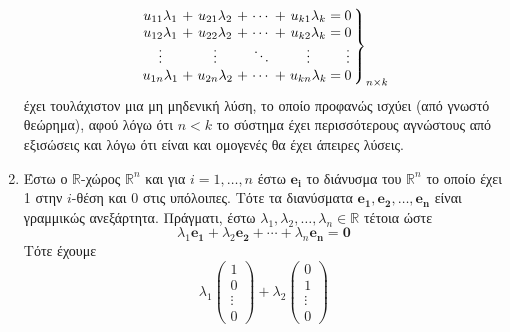 \begin{examples}
\begin{enumerate}
\begin{equation*}
                \setlength\arraycolsep{1.5pt} %
                \left.
                    \begin{array}{ccc ccc c @{\extracolsep{2.5pt}}c
                        @{\extracolsep{2.5pt}}c}
                        u_{11} \lambda _{1} & + & u_{21} \lambda _{2} & + & 
                        \cdots & + & u_{k1}\lambda_{k} & = & 0 \\
                        u_{12}\lambda_{1} & + & u_{22}\lambda_{2} & + & \cdots & 
                        + & u_{k2}\lambda_{k} & = & 0 \\
                        \vdots & & \vdots & & \ddots & &  \vdots & &  \vdots \\
                        u_{1n}\lambda_{1} & + & u_{2n}\lambda_{2} & + & \cdots & 
                        + & u_{kn}\lambda_{k} & = & 0 \\
                    \end{array}
                \right\} _{n \times k}
            \end{equation*}    
            έχει τουλάχιστον μια μη μηδενική λύση, το οποίο προφανώς ισχύει 
            (από γνωστό θεώρημα), αφού λόγω ότι $ n<k $ το σύστημα έχει 
            περισσότερους αγνώστους από εξισώσεις και λόγω ότι είναι και 
            ομογενές θα έχει άπειρες λύσεις.
        \item Έστω ο $ \mathbb{R} $-χώρος $ \mathbb{R}^{n} $ και για $ i= 1,\ldots,n $
            έστω $ \mathbf{e_{i}} $ το διάνυσμα του $ \mathbb{R}^{n} $ το οποίο έχει 
            1 στην $ i $-θέση και 0 στις υπόλοιπες. Τότε τα διανύσματα 
            $ \mathbf{e_{1}}, \mathbf{e_{2}}, \ldots, \mathbf{e_{n}} $ είναι 
            γραμμικώς ανεξάρτητα. Πράγματι, έστω 
            $ \lambda _{1}, \lambda _{2}, \ldots, \lambda _{n} \in \mathbb{R} $ 
            τέτοια ώστε 
            \[
                \lambda _{1} \mathbf{e_{1}}+ \lambda _{2} \mathbf{e_{2}} 
                + \cdots + \lambda _{n} \mathbf{e_{n}}= \mathbf{0}  
            \]
            Τότε έχουμε
            \[
                \lambda _{1} 
                \begin{pmatrix*} 1 \\ 0 \\ \vdots \\ 0 \end{pmatrix*} 
                + \lambda _{2} 
                \begin{pmatrix*} 0 \\ 1 \\ \vdots \\ 0 \end{pmatrix*}
\]
\end{enumerate}
\end{examples}
